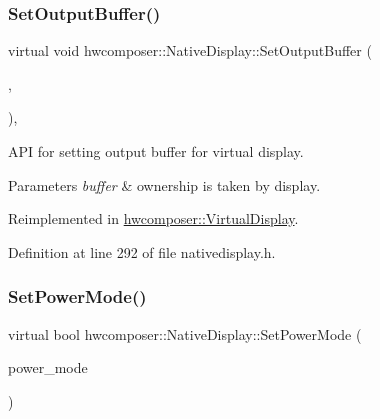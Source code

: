 \subsubsection{\texorpdfstring{Set\+Output\+Buffer()}{SetOutputBuffer()}}
{\footnotesize\ttfamily virtual void hwcomposer\+::\+Native\+Display\+::\+Set\+Output\+Buffer (\begin{DoxyParamCaption}\item[{\mbox{\hyperlink{alios_2platformdefines_8h_ac0a2eaf260f556d17fe489911f017bdf}{H\+W\+C\+Native\+Handle}}}]{,  }\item[{int32\+\_\+t}]{ }\end{DoxyParamCaption})\hspace{0.3cm}{\ttfamily [inline]}, {\ttfamily [virtual]}}

A\+PI for setting output buffer for virtual display. 
\begin{DoxyParams}{Parameters}
{\em buffer} & ownership is taken by display. \\
\hline
\end{DoxyParams}


Reimplemented in \mbox{\hyperlink{classhwcomposer_1_1VirtualDisplay_a392b98e9fbb3ee437212e10b0874512f}{hwcomposer\+::\+Virtual\+Display}}.



Definition at line 292 of file nativedisplay.\+h.


\begin{DoxyCode}{0}
\end{DoxyCode}
\mbox{\label{classhwcomposer_1_1NativeDisplay_a9ea847cb1e75677fca7dabbcfb59a26a}} 
\subsubsection{\texorpdfstring{Set\+Power\+Mode()}{SetPowerMode()}}
{\footnotesize\ttfamily virtual bool hwcomposer\+::\+Native\+Display\+::\+Set\+Power\+Mode (\begin{DoxyParamCaption}\item[{uint32\+\_\+t}]{power\+\_\+mode }\end{DoxyParamCaption})\hspace{0.3cm}{\ttfamily [pure virtual]}}



